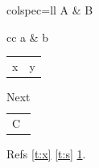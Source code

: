 \documentclass{article}
\begin{document}
\begin{table}
\begin{talltblr}[caption={Hidden}, label={t:x}]{colspec={ll}}
 A & B \\
\end{talltblr}
\end{table}

\begin{table}
\begin{talltblr}[caption={Tall with tabular}, label={t:s}]{cc} a & b \\ \end{talltblr}
\begin{tabular}{cc} x & y \end{tabular}
\end{table}

\begin{table}
\caption{Next}\label{t:y}
\begin{tabular}{l} C \end{tabular}
\end{table}
Refs \ref{t:x} \ref{t:s} \ref{t:y}.
\end{document}
